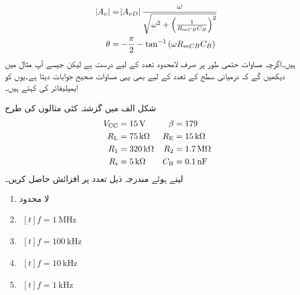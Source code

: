 \begin{gather} \label{مساوات_تعددی_ردعمل_قابو_کپیسٹر_حیطہ_اور_زاویہ}
\begin{aligned}
\abs{A_v} &=\abs{A_{vD}} \frac{\omega}{\sqrt{\omega^2 +\left(\frac{1}{R_{mCB} C_B} \right )^2}}\\
\theta&=-\frac{\pi}{2}-\tan^{-1}\left(\omega R_{mCB} C_B \right )
\end{aligned}
\end{gather}
ہیں۔اگرچہ مساوات  حتمی طور پر صرف لامحدود تعدد کے لیے درست ہے لیکن جیسے آپ مثال   میں دیکھیں گے کہ درمیانی سطح کے تعدد کے لیے بھی یہی مساوات صحیح جوابات دیتا ہے۔یوں   کو ایمپلیفائر کی  کہتے ہیں۔

 
شکل   الف میں گزشتہ کئی مثالوں کی طرح
\begin{align*} 
V_{\textup{CC}}&=\SI{15}{\volt} & \beta &=\num{179}\\ 
R_{\textup {L}}&=\SI{75}{\kilo \ohm} & R_{\textup {E}}&=\SI{15}{\kilo \ohm}\\
R_{\textup {1}}&=\SI{320}{\kilo \ohm} & R_{\textup {2}}&=\SI{1.7}{\mega \ohm}\\
R_{\textup {s}}&=\SI{5}{\kilo \ohm} & C_{\textup{B}}&=\SI{0.1}{\nano \farad}
\end{align*}
  لیتے ہوئے مندرجہ ذیل تعدد پر افزائش   حاصل کریں۔
\begin{enumerate}
\item
لا محدود
\item
$
\begin{aligned}[t]
f=\SI{1}{\mega \hertz}
\end{aligned}
$
\item
$
\begin{aligned}[t]
f=\SI{100}{\kilo \hertz}
\end{aligned}
$
\item
$
\begin{aligned}[t]
f=\SI{10}{\kilo \hertz}
\end{aligned}
$
\item
$
\begin{aligned}[t]
f=\SI{1}{\kilo \hertz}
\end{aligned}
$
\end{enumerate}

